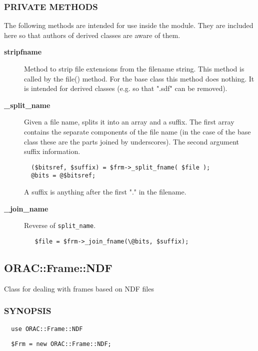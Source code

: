 \subsubsection*{PRIVATE METHODS\label{ORAC::Frame_PRIVATE_METHODS}}

The following methods are intended for use inside the module.
They are included here so that authors of derived classes are 
aware of them.

\begin{description}
\item[\textbf{stripfname}] \mbox{}

Method to strip file extensions from the filename string. This method
is called by the file() method. For the base class this method
does nothing. It is intended for derived classes (e.g. so that ".sdf"
can be removed).

\item[\textbf{\_split\_name}] \mbox{}

Given a file name, splits it into an array and a suffix. The first
array contains the separate components of the file name (in the case
of the base class these are the parts joined by underscores). The
second argument suffix information.

\begin{verbatim}
  ($bitsref, $suffix) = $frm->_split_fname( $file );
  @bits = @$bitsref;
\end{verbatim}


A suffix is anything after the first "." in the filename.

\item[\textbf{\_join\_name}] \mbox{}

Reverse of \texttt{split\_name}.

\begin{verbatim}
   $file = $frm->_join_fname(\@bits, $suffix);
\end{verbatim}
\end{description}


\subsection{ORAC::Frame::NDF\label{ORAC::Frame::NDF}}

Class for dealing with frames based on NDF files

\subsubsection*{SYNOPSIS\label{ORAC::Frame::NDF_SYNOPSIS}}\begin{verbatim}
  use ORAC::Frame::NDF
\end{verbatim}
\begin{verbatim}
  $Frm = new ORAC::Frame::NDF;
\end{verbatim}
